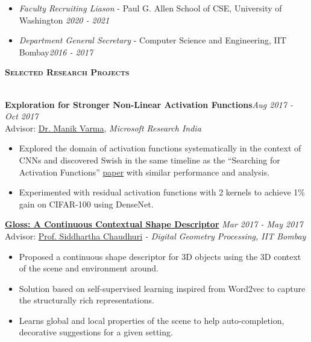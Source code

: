 \documentclass[10pt]{article}
\renewcommand{\section}[1]{
\bigskip
  \begin{Large}
  {\textsc{\textbf{#1}}}
  \end{Large}
  \hrulefill
  \medskip
  \\
}
\newenvironment{innerlist}[1][\enskip\textbullet]%
        {\begin{itemize}[#1,leftmargin=*,parsep=0pt,itemsep=0pt,topsep=0pt,partopsep=0pt]}
        {\end{itemize}}
\newenvironment{lonemidlist}[1][\enskip\textbullet]%
        {\begin{itemize}[#1,leftmargin=*,parsep=0pt,itemsep=4pt,topsep=0pt,partopsep=0pt]}
        {\end{itemize}\vspace{-.6\baselineskip}}
\newcommand{\homepage}{https://homes.cs.washington.edu/~kusupati}
\begin{document}
\begin{lonemidlist}
\begin{itemize}
  \end{itemize}
  \item \textit{Faculty Recruiting Liason} - Paul G. Allen School of CSE, University of Washington \hfill{\textit{2020 - 2021}}
  \item \textit{Department General Secretary} - Computer Science and Engineering, IIT Bombay\hfill{\textit{2016 - 2017}}\\
\end{lonemidlist}


\section{Selected Research Projects}
\textbf{Exploration for Stronger Non-Linear Activation Functions}\hfill{\textit{Aug 2017 - Oct 2017}}\\
Advisor: \href{www.manikvarma.org}{Dr. Manik Varma}, \textit{Microsoft Research India} \\
\vspace{-3mm}
\begin{innerlist}
\item Explored the domain of activation functions systematically in the context of CNNs and discovered Swish in the same timeline as the ``Searching for Activation Functions'' \href{https://arxiv.org/abs/1710.05941}{paper} with similar performance and analysis. 
\item Experimented with residual activation functions with 2 kernels to achieve 1\% gain on CIFAR-100 using DenseNet.\\
\end{innerlist}

\textbf{\href{\homepage/docs/CourseProjects/IITB/DGP.pdf}{Gloss: A Continuous Contextual Shape Descriptor}} \hfill {\textit{Mar 2017 - May 2017}}\\
Advisor: \href{https://www.cse.iitb.ac.in/~sidch/}{Prof. Siddhartha Chaudhuri} \textit{- Digital Geometry Processing, IIT Bombay}\\
\vspace{-3mm}
\begin{innerlist}
\item Proposed a continuous shape descriptor for 3D objects using the 3D context of the scene and environment around.
\item Solution based on self-supervised learning inspired from Word2vec to capture the structurally rich representations.
\item Learns global and local properties of the scene to help auto-completion, decorative suggestions for a given setting.
\end{innerlist}
\end{document}
